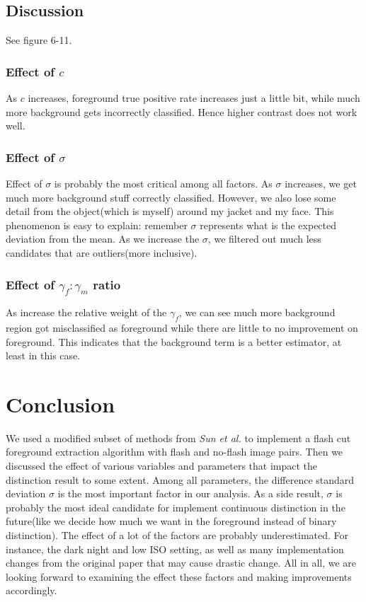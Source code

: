 \documentclass[final]{cvpr}
\begin{document}
\subsection{Discussion}
See figure 6-11.

\subsubsection{Effect of $c$}
As $c$ increases, foreground true positive rate 
increases just a little bit, while much more 
background gets incorrectly classified. Hence higher 
contrast does not work well.

\subsubsection{Effect of $\sigma$}

Effect of $\sigma$ is probably the most critical 
among all factors. As $\sigma$ increases, we get much more 
background stuff correctly classified. However, we also lose 
some detail from the object(which is myself) around my jacket
and my face. This phenomenon is easy to explain: 
remember $\sigma$ represents what is the expected deviation 
from the mean. As we increase the $\sigma$, we filtered out 
much less candidates that are outliers(more inclusive).

\subsubsection{Effect of $\gamma_f:\gamma_m$ ratio}
As increase the relative weight of the $\gamma_f$, we can see 
much more background region got misclassified as foreground while 
there are little to no improvement on foreground. This indicates that 
the background term is a better estimator, at least in this case.

\newpage
\section{Conclusion}
We used a modified subset of methods from \textit{Sun et al.} 
to implement a flash cut foreground extraction algorithm 
with flash and no-flash image pairs. Then we discussed the effect of various
variables and parameters that impact the distinction result to some extent. 
Among all parameters, the difference standard deviation $\sigma$ is 
the most important factor in our analysis. As a side result, $\sigma$ is probably 
the most ideal candidate for implement continuous distinction in 
the future(like we decide how 
much we want in the foreground instead of binary distinction). The effect of 
a lot of the factors are probably underestimated. For instance, the dark night and 
low ISO setting, as well as many implementation changes from the original paper that 
may cause drastic change. All in all, we are looking forward to examining the effect these
factors and making improvements accordingly.
\end{document}
